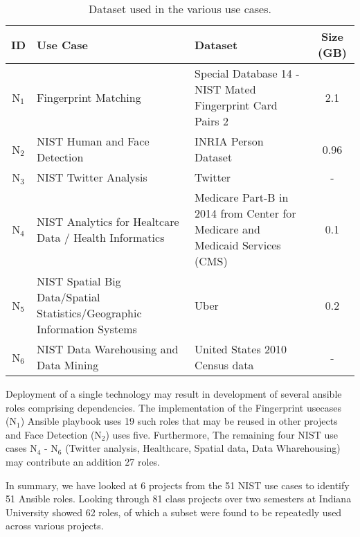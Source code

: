 \begin{table*}[htb]
  \caption{Dataset used in the various use cases.}
  \bigskip
  \label{T:usecase2}
  \begin{center}
    \begin{tabular}{|c|p{}|p{}|c|}

      \hline

      ID    & Use Case                                                                & Dataset                                                                      & Size (GB) \tabularnewline \hline
      N$_1$ & Fingerprint Matching                                                    & Special Database 14 - NIST Mated Fingerprint Card Pairs 2                    & 2.1       \tabularnewline \hline
      N$_2$ & NIST Human and Face Detection                                           & INRIA Person Dataset                                                         & 0.96      \tabularnewline \hline
      N$_3$ & NIST Twitter Analysis                                                   & Twitter                                                                      & -         \tabularnewline \hline
      N$_4$ & NIST Analytics for Healtcare Data / Health Informatics                  & Medicare Part-B in 2014 from Center for Medicare and Medicaid Services (CMS) & 0.1       \tabularnewline \hline
      N$_5$ & NIST Spatial Big Data/Spatial Statistics/Geographic Information Systems & Uber                                                                         & 0.2       \tabularnewline \hline
      N$_6$ & NIST Data Warehousing and Data Mining                                   & United States 2010 Census data                                               & -         \tabularnewline \hline

    \end{tabular}
  \end{center}
\end{table*}


Deployment of a single technology may result in development of several ansible roles comprising dependencies.
The implementation of the Fingerprint usecases (N$_1$) Ansible playbook uses 19 such roles that may be reused in other projects and Face Detection (N$_2$) uses five.
Furthermore, The remaining four NIST use cases N$_4$ - N$_6$ (Twitter analysis, Healthcare, Spatial data, Data Wharehousing) may contribute an addition 27 roles.

In summary, we have looked at 6 projects from the 51 NIST use cases to identify 51 Ansible roles.
Looking through 81 class projects over two semesters at Indiana University showed 62 roles, of which a subset were found to be repeatedly used across various projects.

